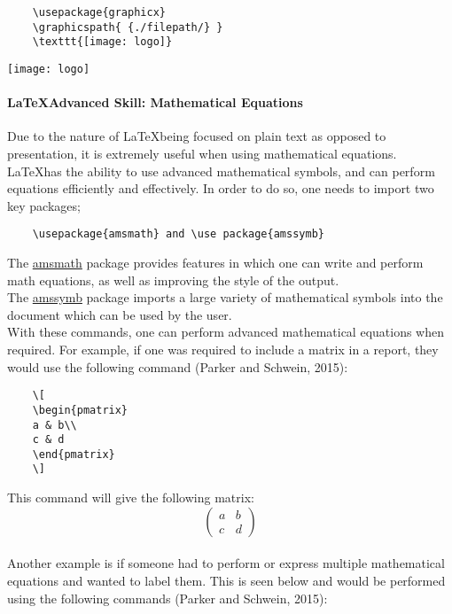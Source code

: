 \documentclass[a4paper, 11pt]{report}
\begin{document}
    \begin{verbatim}
    \usepackage{graphicx}
    \graphicspath{ {./filepath/} } 
    \texttt{[image: logo]}
    \end{verbatim}

    \begin{center}
    \texttt{[image: logo]}
    \end{center}
 
    \paragraph{\LaTeX \space Advanced Skill: Mathematical Equations} Due to the nature of \LaTeX \space being focused on plain text as opposed to presentation, it is extremely useful when using mathematical equations. \LaTeX \space has the ability to use advanced mathematical symbols, and can perform equations efficiently and effectively. In order to do so, one needs to import two key packages;
    \begin{verbatim}
    \usepackage{amsmath} and \use package{amssymb}
    \end{verbatim}  
    The \underline{amsmath} package provides features in which one can write and perform math equations, as well as improving the style of the output.
    \\
    The \underline{amssymb} package imports a large variety of mathematical symbols into the document which can be used by the user. 
    \\
    \unindent
    With these commands, one can perform advanced mathematical equations when required. For example, if one was required to include a matrix in a report, they would use the following command (Parker and Schwein, 2015):
    \begin{verbatim}
    \[
    \begin{pmatrix}
    a & b\\
    c & d
    \end{pmatrix}
    \]
    \end{verbatim}  
    
    \noindent
    This command will give the following matrix:
    \[
    \begin{pmatrix}
    a & b\\
    c & d
    \end{pmatrix}
    \]
    \\
    \noindent
    Another example is if someone had to perform or express multiple mathematical equations and wanted to label them. This is seen below and would be performed using the following commands (Parker and Schwein, 2015):
    
\end{document}
